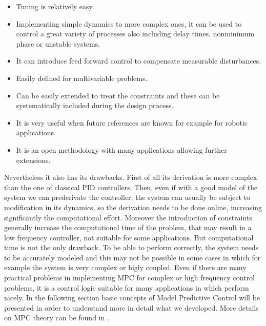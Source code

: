 \begin{itemize}
\item Tuning is relatively easy.
\item Implementing simple dynamics to more complex ones, it can be used to control a great variety of processes also including delay times, nonminimum phase or unstable systems.
\item It can introduce feed forward control to compensate measurable disturbances.
\item Easily defined for multivariable problems.
\item Can be easily extended to treat the constraints and these can be systematically included during the design process.
\item It is very useful when future references are
known for example for robotic applications.
\item It is an open methodology with many applications allowing further extensions.
\end{itemize}

Nevertheless it also has its drawbacks. First of all its derivation is more complex than the one of classical PID controllers. Then, even if with a good model of the system we can prederivate the controller, the system can usually be subject to modification in its dynamics, so the derivation needs to be done online, increasing significantly the computational effort. Moreover the introduction of constraints generally increase the computational time of the problem, that may result in a low frequency controller, not suitable for some applications.
But computational time is not the only drawback. To be able to perform correctly, the system needs to be accurately modeled and this may not be possible in some cases in which for example the system is very complex or higly coupled.
Even if there are many practical problems in implementing MPC for complex or high frequency control problems, it is a control logic suitable for many applications in which perform nicely. 
In the following section basic concepts of Model Predictive Control will be presented in order to understand more in detail what we developed. More details on MPC theory can be found in \cite{camacho2013model}.
